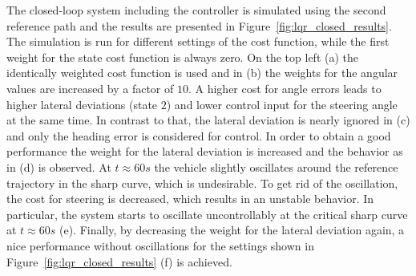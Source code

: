 The closed-loop system including the controller is simulated using the second reference path and the results are presented in Figure~\ref{fig:lqr_closed_results}.
The simulation is run for different settings of the cost function, while the first weight for the state cost function is always zero.
On the top left (a) the identically weighted cost function is used and in (b) the weights for the angular values are increased by a factor of $10$.
A higher cost for angle errors leads to higher lateral deviations (state $2$) and lower control input for the steering angle at the same time.
In contrast to that, the lateral deviation is nearly ignored in (c) and only the heading error is considered for control.
In order to obtain a good performance the weight for the lateral deviation is increased and the behavior as in (d) is observed. 
At $t \approx 60s$ the vehicle slightly oscillates around the reference trajectory in the sharp curve, which is undesirable.
To get rid of the oscillation, the cost for steering is decreased, which results in an unstable behavior.
In particular, the system starts to oscillate uncontrollably at the critical sharp curve at $t \approx 60s$ (e).
Finally, by decreasing the weight for the lateral deviation again, a nice performance without oscillations for the settings shown in Figure~\ref{fig:lqr_closed_results} (f) is achieved.

